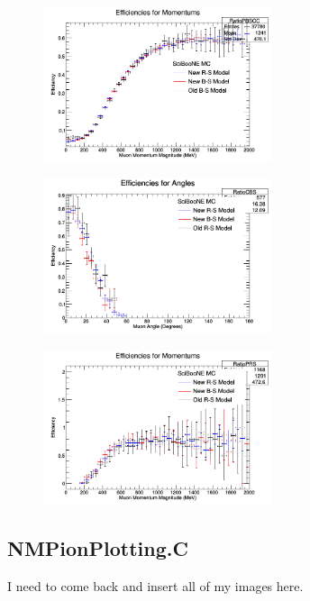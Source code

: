 \documentclass[11pt]{article}
\begin{document}
\begin{figure}[H]
\centering
\includegraphics[width=0.6\textwidth]{NMCombinedPlotsImages/23-NMCombinedPlots.png}
\caption{}
\end{figure}

\begin{figure}[H]
\centering
\includegraphics[width=0.6\textwidth]{NMCombinedPlotsImages/24-NMCombinedPlots.png}
\caption{}
\end{figure}

\begin{figure}[H]
\centering
\includegraphics[width=0.6\textwidth]{NMCombinedPlotsImages/25-NMCombinedPlots.png}
\caption{}
\end{figure}

\subsection{NMPionPlotting.C}
I need to come back and insert all of my images here.
\end{document}

